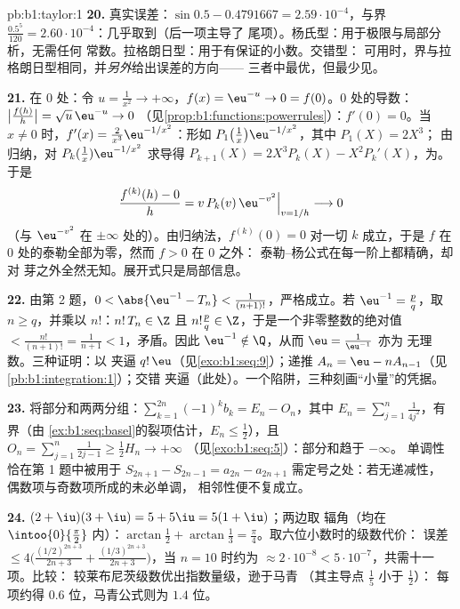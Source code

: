 \begin{solution}{pb:b1:taylor:1}
\textbf{20.} 真实误差：$\sin 0.5 - 0.4791667 =
2.59\cdot10^{-4}$，与界 $\frac{0.5^5}{120} =
2.60\cdot10^{-4}$：几乎取到（后一项主导了
尾项）。杨氏型：用于极限与局部分析，无需任何
常数。拉格朗日型：用于有保证的小数。交错型：
可用时，界与拉格朗日型相同，并\emph{另外}给出误差的方向——
三者中最优，但最少见。

\textbf{21.} 在 $0$ 处：令 $u = \frac{1}{x^2} \to
+\infty$，$f(x) = \eu^{-u} \to 0 = f(0)$。$0$ 处的导数：
$\bigl|\frac{f(h)}{h}\bigr| = \sqrt u\,\eu^{-u} \to 0$
（见\cref{prop:b1:functions:powerrules}）：$f'(0) = 0$。当 $x \neq
0$ 时，$f'(x) = \frac{2}{x^3}\eu^{-1/x^2}$：形如
$P_1\bigl(\frac1x\bigr)\eu^{-1/x^2}$，其中 $P_1(X) = 2X^3$；
由归纳，对 $P_k(\frac1x)\eu^{-1/x^2}$ 求导得
$P_{k+1}(X) = 2X^3 P_k(X) - X^2 P_k'(X)$，为。于是
\[
\frac{f^{(k)}(h) - 0}{h} = v\,P_k(v)\,\eu^{-v^2}
\Big|_{v = 1/h} \longrightarrow 0
\]
（与 $\eu^{-v^2}$ 在
$\pm\infty$ 处的）。由归纳法，$f^{(k)}(0) = 0$ 对一切 $k$ 成立，于是
$f$ 在 $0$ 处的泰勒全部为零，然而 $f > 0$ 在 $0$ 之外：
泰勒--杨公式在每一阶上都精确，却对
芽之外全然无知。展开式只是局部信息。

\textbf{22.} 由第 2 题，$0 < \abs{\eu^{-1} - T_n} <
\frac{1}{(n+1)!}$，严格成立。若 $\eu^{-1} = \frac pq$，取 $n
\geq q$，并乘以 $n!$：$n!\,T_n \in \Z$ 且 $n!\frac pq
\in \Z$，于是一个非零整数的绝对值 $<
\frac{n!}{(n+1)!} = \frac{1}{n+1} < 1$，矛盾。因此
$\eu^{-1} \notin \Q$，从而 $\eu = \frac{1}{\eu^{-1}}$ 亦为
无理数。三种证明：以
夹逼 $q!\,\eu$（见\cref{exo:b1:seq:9}）；递推 $A_n =
\eu - nA_{n-1}$（见\cref{pb:b1:integration:1}）；交错
夹逼（此处）。一个陷阱，三种刻画“小量”的凭据。

\textbf{23.} 将部分和两两分组：$\sum_{k=1}^{2n}
(-1)^k b_k = E_n - O_n$，其中 $E_n = \sum_{j=1}^{n}
\frac{1}{4j^2}$，有界（由
\cref{ex:b1:seq:basel}的裂项估计，$E_n \leq \frac12$），且 $O_n =
\sum_{j=1}^{n}\frac{1}{2j-1} \geq \frac12 H_n \to +\infty$
（见\cref{exo:b1:seq:5}）：部分和趋于 $-\infty$。
单调性恰在第 1 题中被用于 $S_{2n+1} -
S_{2n-1} = a_{2n} - a_{2n+1}$ 需定号之处：若无递减性，
偶数项与奇数项所成的未必单调，
相邻性便不复成立。

\textbf{24.} $(2+\iu)(3+\iu) = 5 + 5\iu = 5(1+\iu)$；两边取
辐角（均在 $\intoo{0}{\frac\pi2}$ 内）：$\arctan\frac12 +
\arctan\frac13 = \frac\pi4$。取六位小数时的级数代价：
误差 $\leq 4\bigl(\frac{(1/2)^{2n+3}}{2n+3} +
\frac{(1/3)^{2n+3}}{2n+3}\bigr)$，当 $n = 10$ 时约为
$\approx 2\cdot10^{-8} < 5\cdot10^{-7}$，共需十一项。比较：
较莱布尼茨级数优出指数量级，逊于马青
（其主导点 $\frac15$ 小于 $\frac12$）：
每项约得 $0.6$ 位，马青公式则为 $1.4$ 位。


\end{solution}
